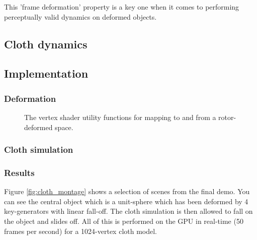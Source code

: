This 'frame deformation' property is a key one when it comes to performing perceptually
valid dynamics on deformed objects.

\subsection{Cloth dynamics}

\subsection{Implementation}

\subsubsection{Deformation}

\begin{figure}[p]
\centering
\scalebox{0.7}{
\begin{minipage}{\textwidth}
\singlespacing

\end{minipage}}
\caption{\label{fig:map}The vertex shader utility functions for mapping to and
  from a rotor-deformed space.}
\end{figure}

\subsubsection{Cloth simulation}

\subsubsection{Results}

Figure \ref{fig:cloth_montage} shows a selection of scenes from the final demo. You can
see the central object which is a unit-sphere which has been deformed by 4 key-generators
with linear fall-off. The cloth simulation is then allowed to fall on the object and slides
off. All of this is performed on the GPU in real-time (50 frames per second) for a 1024-vertex cloth
model.

